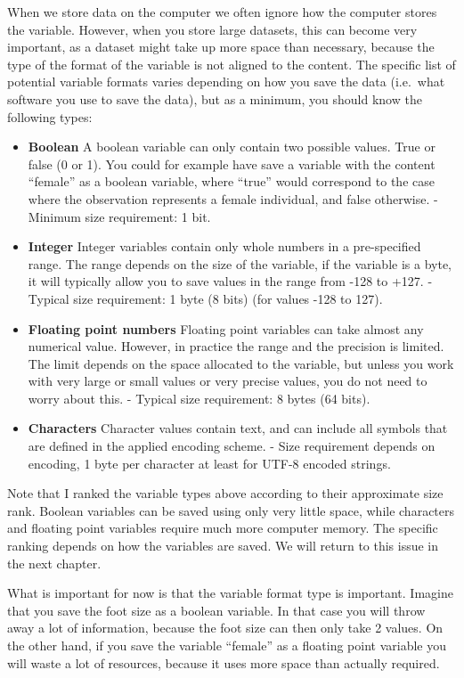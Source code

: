 \documentclass[]{book}
\begin{document}
When we store data on the computer we often ignore how the computer stores the variable. However, when you store large datasets, this can become very important, as a dataset might take up more space than necessary, because the type of the format of the variable is not aligned to the content.
The specific list of potential variable formats varies depending on how you save the data (i.e.~what software you use to save the data), but as a minimum, you should know the following types:

\begin{itemize}
\item
  \textbf{Boolean}
  A boolean variable can only contain two possible values. True or false (0 or 1). You could for example have save a variable with the content ``female'' as a boolean variable, where ``true'' would correspond to the case where the observation represents a female individual, and false otherwise.
  - Minimum size requirement: 1 bit.
\item
  \textbf{Integer}
  Integer variables contain only whole numbers in a pre-specified range. The range depends on the size of the variable, if the variable is a byte, it will typically allow you to save values in the range from -128 to +127.
  - Typical size requirement: 1 byte (8 bits) (for values -128 to 127).
\item
  \textbf{Floating point numbers}
  Floating point variables can take almost any numerical value. However, in practice the range and the precision is limited. The limit depends on the space allocated to the variable, but unless you work with very large or small values or very precise values, you do not need to worry about this.
  - Typical size requirement: 8 bytes (64 bits).
\item
  \textbf{Characters}
  Character values contain text, and can include all symbols that are defined in the applied encoding scheme.
  - Size requirement depends on encoding, 1 byte per character at least for UTF-8 encoded strings.
\end{itemize}

Note that I ranked the variable types above according to their approximate size rank. Boolean variables can be saved using only very little space, while characters and floating point variables require much more computer memory. The specific ranking depends on how the variables are saved. We will return to this issue in the next chapter.

What is important for now is that the variable format type is important. Imagine that you save the foot size as a boolean variable. In that case you will throw away a lot of information, because the foot size can then only take 2 values. On the other hand, if you save the variable ``female'' as a floating point variable you will waste a lot of resources, because it uses more space than actually required.
\end{document}
